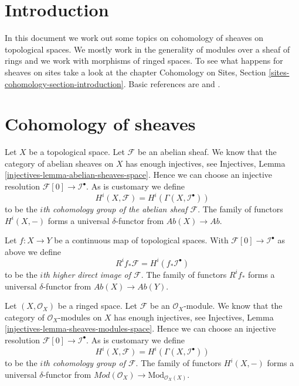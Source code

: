 \section{Introduction}
\label{cohomology-section-introduction}
In this document we work out some topics on cohomology of sheaves
on topological spaces. We mostly work in the generality of modules
over a sheaf of rings and we work with morphisms of ringed spaces.
To see what happens for sheaves on sites take a look at the chapter
Cohomology on Sites, Section \ref{sites-cohomology-section-introduction}.
Basic references are \cite{Godement} and \cite{Iversen}.

\section{Cohomology of sheaves}
\label{cohomology-section-cohomology-sheaves}
Let $X$ be a topological space. Let $\mathcal{F}$ be an abelian sheaf.
We know that the category of abelian sheaves on $X$ has enough injectives, see
Injectives, Lemma \ref{injectives-lemma-abelian-sheaves-space}.
Hence we can choose an injective resolution
$\mathcal{F}[0] \to \mathcal{I}^\bullet$. As is customary we define
\begin{equation}
\label{equation-cohomology}
H^i(X, \mathcal{F}) = H^i(\Gamma(X, \mathcal{I}^\bullet))
\end{equation}
to be the {\it $i$th cohomology group of the abelian sheaf $\mathcal{F}$}.
The family of functors $H^i(X, -)$ forms a universal $\delta$-functor
from $\textit{Ab}(X) \to \textit{Ab}$.

\medskip\noindent
Let $f : X \to Y$ be a continuous map of topological spaces. With
$\mathcal{F}[0] \to \mathcal{I}^\bullet$ as above
we define
\begin{equation}
\label{equation-higher-direct-image}
R^if_*\mathcal{F} = H^i(f_*\mathcal{I}^\bullet)
\end{equation}
to be the {\it $i$th higher direct image of $\mathcal{F}$}.
The family of functors $R^if_*$ forms a universal $\delta$-functor
from $\textit{Ab}(X) \to \textit{Ab}(Y)$.

\medskip\noindent
Let $(X, \mathcal{O}_X)$ be a ringed space. Let $\mathcal{F}$ be an
$\mathcal{O}_X$-module. We know that the category of $\mathcal{O}_X$-modules
on $X$ has enough injectives, see
Injectives, Lemma \ref{injectives-lemma-sheaves-modules-space}.
Hence we can choose an injective resolution
$\mathcal{F}[0] \to \mathcal{I}^\bullet$. As is customary we define
\begin{equation}
\label{equation-cohomology-modules}
H^i(X, \mathcal{F}) = H^i(\Gamma(X, \mathcal{I}^\bullet))
\end{equation}
to be the {\it $i$th cohomology group of $\mathcal{F}$}.
The family of functors $H^i(X, -)$ forms a universal $\delta$-functor
from $\textit{Mod}(\mathcal{O}_X) \to \text{Mod}_{\mathcal{O}_X(X)}$.

